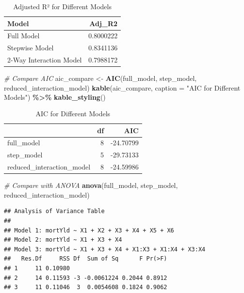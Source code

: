\documentclass[
  12pt,
]{article}
\newenvironment{Shaded}{\begin{snugshade}}{\end{snugshade}}
\newcommand{\AttributeTok}[1]{\textcolor[rgb]{0.13,0.29,0.53}{#1}}
\newcommand{\CommentTok}[1]{\textcolor[rgb]{0.56,0.35,0.01}{\textit{#1}}}
\newcommand{\FunctionTok}[1]{\textcolor[rgb]{0.13,0.29,0.53}{\textbf{#1}}}
\newcommand{\NormalTok}[1]{#1}
\newcommand{\OtherTok}[1]{\textcolor[rgb]{0.56,0.35,0.01}{#1}}
\newcommand{\SpecialCharTok}[1]{\textcolor[rgb]{0.81,0.36,0.00}{\textbf{#1}}}
\newcommand{\StringTok}[1]{\textcolor[rgb]{0.31,0.60,0.02}{#1}}
\begin{document}
\begin{longtable}[t]{lr}
\caption{\label{tab:unnamed-chunk-16}Adjusted R² for Different Models}\\
\toprule
Model & Adj\_R2\\
\midrule
Full Model & 0.8000222\\
Stepwise Model & 0.8341136\\
2-Way Interaction Model & 0.7988172\\
\bottomrule
\end{longtable}

\begin{Shaded}
\begin{Highlighting}[]
\CommentTok{\# Compare AIC}
\NormalTok{aic\_compare }\OtherTok{\textless{}{-}} \FunctionTok{AIC}\NormalTok{(full\_model, step\_model, reduced\_interaction\_model)}
\FunctionTok{kable}\NormalTok{(aic\_compare, }\AttributeTok{caption =} \StringTok{"AIC for Different Models"}\NormalTok{) }\SpecialCharTok{\%\textgreater{}\%} \FunctionTok{kable\_styling}\NormalTok{()}
\end{Highlighting}
\end{Shaded}

\begin{longtable}[t]{lrr}
\caption{\label{tab:unnamed-chunk-16}AIC for Different Models}\\
\toprule
 & df & AIC\\
\midrule
full\_model & 8 & -24.70799\\
step\_model & 5 & -29.73133\\
reduced\_interaction\_model & 8 & -24.59986\\
\bottomrule
\end{longtable}

\begin{Shaded}
\begin{Highlighting}[]
\CommentTok{\# Compare with ANOVA}
\FunctionTok{anova}\NormalTok{(full\_model, step\_model, reduced\_interaction\_model)}
\end{Highlighting}
\end{Shaded}

\begin{verbatim}
## Analysis of Variance Table
## 
## Model 1: mortYld ~ X1 + X2 + X3 + X4 + X5 + X6
## Model 2: mortYld ~ X1 + X3 + X4
## Model 3: mortYld ~ X1 + X3 + X4 + X1:X3 + X1:X4 + X3:X4
##   Res.Df     RSS Df  Sum of Sq      F Pr(>F)
## 1     11 0.10980                            
## 2     14 0.11593 -3 -0.0061224 0.2044 0.8912
## 3     11 0.11046  3  0.0054608 0.1824 0.9062
\end{verbatim}
\end{document}
